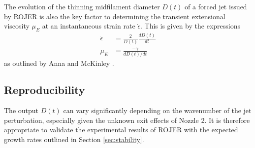 \documentclass[11pt]{article}
\newcommand{\od}[2]{\frac{d #1}{d #2}}
\begin{document}
The evolution of the thinning midfilament diameter $D(t)$ of a forced jet issued by ROJER is also the key factor to determining the transient extensional viscosity $\mu_E$ at an instantaneous strain rate $\dot{\epsilon}$. This is given by the expressions
\begin{align}
\dot{\epsilon} &= \frac{2}{D(t)} \od{D(t)}{t} \label{eqn:strain_rate} \\
\mu_E &= \frac{- \gamma}{d D(t) / dt} \label{eqn:ext_viscosity}
\end{align}
as outlined by Anna and McKinley \cite{anna2001elasto}.

\subsection{Reproducibility} \label{sec:reproducibility}
The output $D(t)$ can vary significantly depending on the wavenumber of the jet perturbation, especially given the unknown exit effects of Nozzle 2. It is therefore appropriate to validate the experimental results of ROJER with the expected growth rates outlined in Section \ref{sec:stability}.
\end{document}
